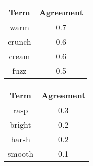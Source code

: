 \begin{tabular}{|c|c|}
	\hline
	\bf{Term} & \bf{Agreement} \tabularnewline
	\hline
	\hline
	warm & 0.7 \tabularnewline
	\hline
	crunch & 0.6 \tabularnewline
	\hline
	cream & 0.6 \tabularnewline
	\hline
	fuzz & 0.5 \tabularnewline
	\hline
\end{tabular}
\qquad
\begin{tabular}{|c|c|}
	\hline
	\bf{Term} & \bf{Agreement} \tabularnewline
	\hline
	\hline
	rasp & 0.3 \tabularnewline
	\hline
	bright & 0.2 \tabularnewline
	\hline
	harsh & 0.2 \tabularnewline
	\hline
	smooth & 0.1 \tabularnewline
	\hline
\end{tabular}
